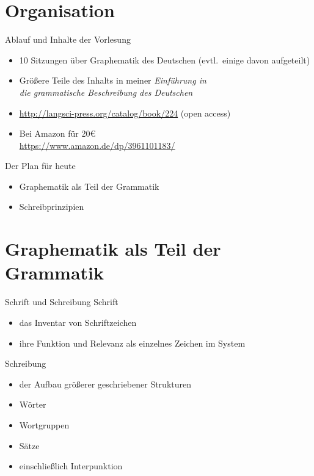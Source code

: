 
\section{Organisation}

\begin{frame}
  {Ablauf und Inhalte der Vorlesung}
  \begin{itemize}
    \item 10 Sitzungen über Graphematik des Deutschen (evtl.\ einige davon aufgeteilt)
    \item Größere Teile des Inhalts in meiner \alert{\textit{Einführung in\\
      die grammatische Beschreibung des Deutschen}} 
    \item \url{http://langsci-press.org/catalog/book/224} (\alert{open access})
      \vspace{\baselineskip}
    \item Bei Amazon für 20€\\
      \url{https://www.amazon.de/dp/3961101183/}
  \end{itemize}
\end{frame}

\begin{frame}
  {Der Plan für heute}
  \pause
  \begin{itemize}
    \item Graphematik als Teil der Grammatik
    \item Schreibprinzipien
  \end{itemize}
\end{frame}


\section[Graphematik]{Graphematik als Teil der Grammatik}

\begin{frame}
  {Schrift und Schreibung}
  \onslide<+->
  \onslide<+->
  \alert{Schrift}\\
  \Halbzeile
  \begin{itemize}[<+->]
    \item das Inventar von Schriftzeichen
    \item ihre Funktion und Relevanz als einzelnes Zeichen im System
  \end{itemize}
  \onslide<+->
  \Zeile
  \alert{Schreibung}\\
  \Halbzeile
  \begin{itemize}[<+->]
    \item der Aufbau größerer geschriebener Strukturen
    \item Wörter
    \item Wortgruppen
    \item Sätze
    \item einschließlich Interpunktion
  \end{itemize}
\end{frame}

